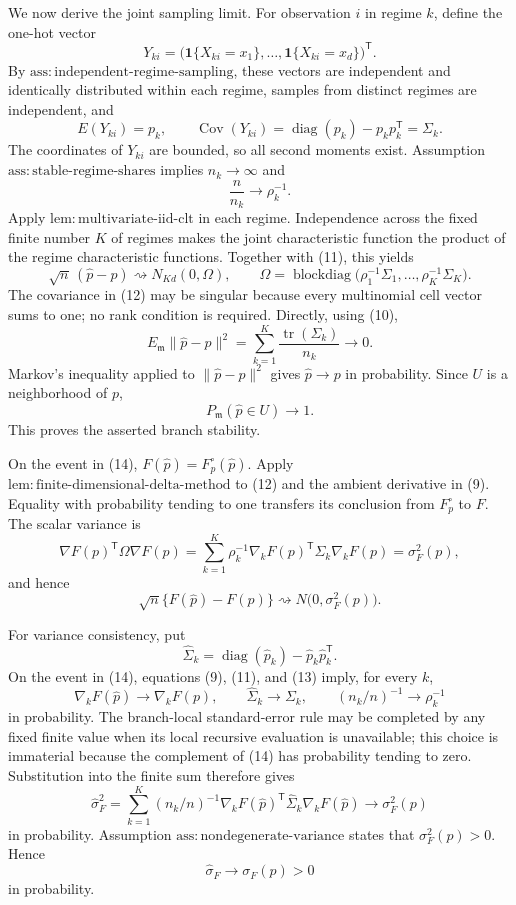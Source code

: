 We now derive the joint sampling limit. For observation \(i\) in regime \(k\), define the one-hot vector
\[
 Y_{ki}=\bigl(\mathbf 1\{X_{ki}=x_1\},\ldots,
                    \mathbf 1\{X_{ki}=x_d\}\bigr)^{\mathsf T}.
\]
By \(\mathrm{ass:independent\text{-}regime\text{-}sampling}\), these vectors are independent and identically distributed within each regime, samples from distinct regimes are independent, and
\[
 E(Y_{ki})=p_k,
 \qquad
 \operatorname{Cov}(Y_{ki})
 =\operatorname{diag}(p_k)-p_kp_k^{\mathsf T}
 =\Sigma_k. \tag{10}
\]
The coordinates of \(Y_{ki}\) are bounded, so all second moments exist. Assumption \(\mathrm{ass:stable\text{-}regime\text{-}shares}\) implies \(n_k\to\infty\) and
\[
 \frac{n}{n_k}\longrightarrow\rho_k^{-1}. \tag{11}
\]
Apply \(\mathrm{lem:multivariate\text{-}iid\text{-}clt}\) in each regime. Independence across the fixed finite number \(K\) of regimes makes the joint characteristic function the product of the regime characteristic functions. Together with (11), this yields
\[
 \sqrt n\,(\widehat p-p)
 \rightsquigarrow
 N_{Kd}(0,\Omega),
 \qquad
 \Omega=\operatorname{blockdiag}
 \bigl(\rho_1^{-1}\Sigma_1,\ldots,
       \rho_K^{-1}\Sigma_K\bigr). \tag{12}
\]
The covariance in (12) may be singular because every multinomial cell vector sums to one; no rank condition is required. Directly, using (10),
\[
 E_{\mathfrak m}\|\widehat p-p\|^2
 =\sum_{k=1}^{K}\frac{\operatorname{tr}(\Sigma_k)}{n_k}
 \longrightarrow0. \tag{13}
\]
Markov's inequality applied to \(\|\widehat p-p\|^2\) gives \(\widehat p\to p\) in probability. Since \(U\) is a neighborhood of \(p\),
\[
 P_{\mathfrak m}(\widehat p\in U)\longrightarrow1. \tag{14}
\]
This proves the asserted branch stability.

On the event in (14), \(F(\widehat p)=F_p^{\circ}(\widehat p)\). Apply \(\mathrm{lem:finite\text{-}dimensional\text{-}delta\text{-}method}\) to (12) and the ambient derivative in (9). Equality with probability tending to one transfers its conclusion from \(F_p^{\circ}\) to \(F\). The scalar variance is
\[
 \nabla F(p)^{\mathsf T}\Omega\nabla F(p)
 =\sum_{k=1}^{K}\rho_k^{-1}
   \nabla_kF(p)^{\mathsf T}\Sigma_k\nabla_kF(p)
 =\sigma_F^2(p), \tag{15}
\]
and hence
\[
 \sqrt n\{F(\widehat p)-F(p)\}
 \rightsquigarrow N\bigl(0,\sigma_F^2(p)\bigr). \tag{16}
\]

For variance consistency, put
\[
 \widehat\Sigma_k
 =\operatorname{diag}(\widehat p_k)
  -\widehat p_k\widehat p_k^{\mathsf T}.
\]
On the event in (14), equations (9), (11), and (13) imply, for every \(k\),
\[
 \nabla_kF(\widehat p)\to\nabla_kF(p),
 \qquad
 \widehat\Sigma_k\to\Sigma_k,
 \qquad
 (n_k/n)^{-1}\to\rho_k^{-1} \tag{17}
\]
in probability. The branch-local standard-error rule may be completed by any fixed finite value when its local recursive evaluation is unavailable; this choice is immaterial because the complement of (14) has probability tending to zero. Substitution into the finite sum therefore gives
\[
 \widehat\sigma_F^2
 =\sum_{k=1}^{K}(n_k/n)^{-1}
   \nabla_kF(\widehat p)^{\mathsf T}
   \widehat\Sigma_k
   \nabla_kF(\widehat p)
 \longrightarrow\sigma_F^2(p) \tag{18}
\]
in probability. Assumption \(\mathrm{ass:nondegenerate\text{-}variance}\) states that \(\sigma_F^2(p)>0\). Hence
\[
 \widehat\sigma_F\longrightarrow\sigma_F(p)>0 \tag{19}
\]
in probability.


